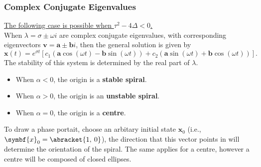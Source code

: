 \documentclass{article}
\begin{document}
\subsubsection{Complex Conjugate Eigenvalues}
\underline{The following case is possible when \(\tau^2 - 4\Delta < 0\).} \\[1em]
When \(\lambda = \sigma \pm \omega i\) are complex conjugate eigenvalues,
with corresponding eigenvectors \(\symbf{v} = \symbf{a} \pm \symbf{b} i\), then the general solution is given by
\begin{equation*}
    \symbf{x}\left( t \right) = e^{\sigma t} \left[ c_1 \left( \symbf{a} \cos{\left( \omega t \right)} - \symbf{b} \sin{\left( \omega t \right)} \right) + c_2 \left( \symbf{a} \sin{\left( \omega t \right)} + \symbf{b} \cos{\left( \omega t \right)} \right) \right].
\end{equation*}
The stability of this system is determined by the real part of \(\lambda\).
\begin{itemize}
    \item When \(\alpha < 0\), the origin is a \textbf{stable spiral}.
    \item When \(\alpha > 0\), the origin is an \textbf{unstable spiral}.
    \item When \(\alpha = 0\), the origin is a \textbf{centre}.
\end{itemize}
To draw a phase portait, choose an arbitary initial state \(\symbf{x}_0\) (i.e., \(\symbf{x}_0 = \abracket{1,\: 0}\)),
the direction that this vector points in will determine the orientation of the spiral. The same applies for a centre,
however a centre will be composed of closed ellipses.
\end{document}
